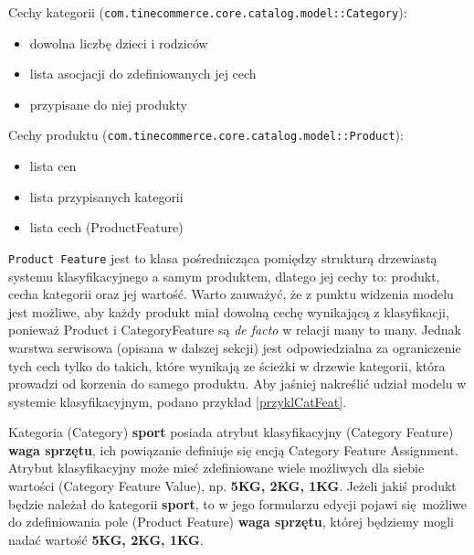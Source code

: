 \noindent Cechy kategorii (\texttt{com.tinecommerce.core.catalog.model::Category}):
\begin{itemize}
	\item dowolna liczbę dzieci i rodziców
	\item lista asocjacji do zdefiniowanych jej cech
	\item przypisane do niej produkty
\end{itemize} 
Cechy produktu (\texttt{com.tinecommerce.core.catalog.model::Product}):
\begin{itemize}
	\item lista cen
	\item lista przypisanych kategorii
	\item lista cech (ProductFeature)
\end{itemize}
\texttt{Product Feature} jest to klasa pośrednicząca pomiędzy strukturą drzewiastą systemu klasyfikacyjnego a samym produktem, dlatego jej cechy to: produkt, cecha kategorii oraz jej wartość. Warto zauważyć, że z punktu widzenia modelu jest możliwe, aby każdy produkt miał dowolną cechę wynikającą z klasyfikacji, ponieważ Product i CategoryFeature są  \textit{de facto} w relacji many to many. Jednak warstwa serwisowa (opisana w dalszej sekcji) jest odpowiedzialna za ograniczenie tych cech tylko do takich, które wynikają ze ścieżki w drzewie kategorii, która prowadzi od korzenia do samego produktu. Aby jaśniej nakreślić udział modelu w systemie klasyfikacyjnym, podano przykład \ref{przyklCatFeat}.
\begin{example}
	\label{przyklCatFeat}
	Kategoria (Category) \textbf{sport} posiada atrybut klasyfikacyjny (Category Feature) \textbf{waga sprzętu}, ich powiązanie definiuje się encją Category Feature Assignment. Atrybut klasyfikacyjny może mieć zdefiniowane wiele możliwych dla siebie wartości (Category Feature Value), np. \textbf{5KG, 2KG, 1KG}. Jeżeli jakiś produkt będzie należał do kategorii \textbf{sport}, to w jego formularzu edycji pojawi się możliwe do zdefiniowania pole (Product Feature) \textbf{waga sprzętu}, której będziemy mogli nadać wartość \textbf{5KG, 2KG, 1KG}.
\end{example}


